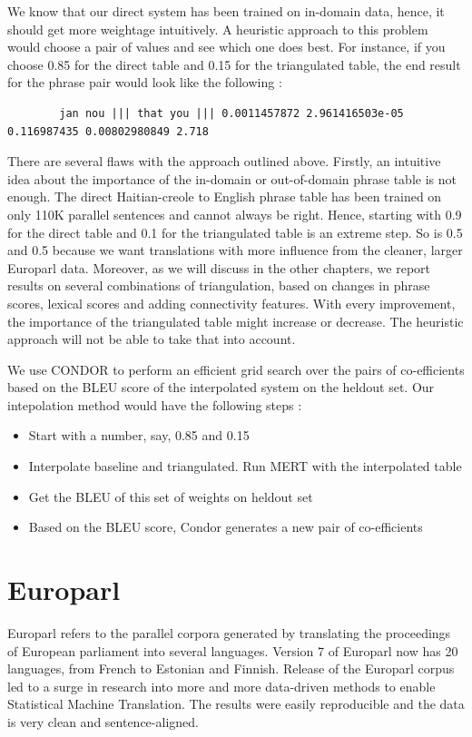 		We know that our direct system has been trained on in-domain data, hence, it should get more weightage intuitively. A heuristic approach to this problem would choose a pair of values and see which one does best. For instance, if you choose 0.85 for the direct table and 0.15 for the triangulated table, the end result for the phrase pair would look like the following : 

	\begin{verbatim}
		jan nou ||| that you ||| 0.0011457872 2.961416503e-05 0.116987435 0.00802980849 2.718	
	\end{verbatim}

		There are several flaws with the approach outlined above. Firstly, an intuitive idea about the importance of the in-domain or out-of-domain phrase table is not enough. The direct Haitian-creole to English phrase table has been trained on only 110K parallel sentences and cannot always be right. Hence, starting with 0.9 for the direct table and 0.1 for the triangulated table is an extreme step. So is 0.5 and 0.5 because we want translations with more influence from the cleaner, larger Europarl data. Moreover, as we will discuss in the other chapters, we report results on several combinations of triangulation, based on changes in phrase scores, lexical scores and adding connectivity features. With every improvement, the importance of the triangulated table might increase or decrease. The heuristic approach will not be able to take that into account. 

		We use CONDOR to perform an efficient grid search over the pairs of co-efficients based on the BLEU score of the interpolated system on the heldout set. Our intepolation method would have the following steps : 
 
		\begin{itemize}
			\item Start with a number, say, 0.85 and 0.15
			\item Interpolate baseline and triangulated. Run MERT with the interpolated table
			\item Get the BLEU of this set of weights on heldout set
			\item Based on the BLEU score, Condor generates a new pair of co-efficients
		\end{itemize}



\section{Europarl}
Europarl refers to the parallel corpora generated by translating the proceedings of European parliament into several languages. Version 7 of Europarl now has 20 languages, from French to Estonian and Finnish. Release of the Europarl corpus led to a surge in research into more and more data-driven methods to enable Statistical Machine Translation. The results were easily reproducible and the data is very clean and sentence-aligned. 

